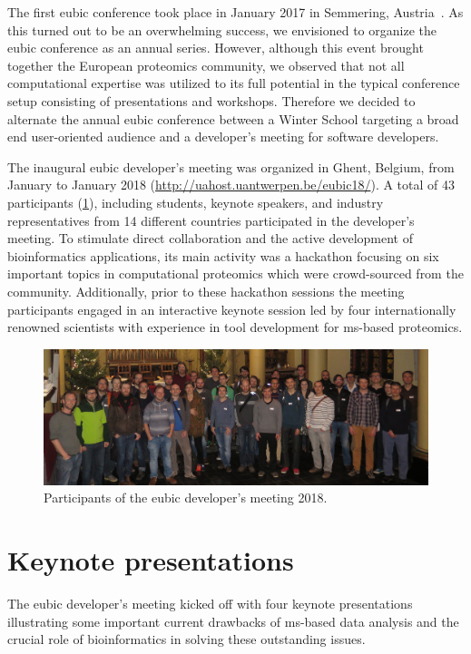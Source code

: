 \documentclass[fontsize=11pt, paper=a4, titlepage=false]{scrartcl}
\begin{document}
The first \gls{eubic} conference took place in January 2017 in Semmering, 
Austria~\autocite{Willems2017}. As this turned out to be an overwhelming 
success, we envisioned to organize the \gls{eubic} conference as an annual 
series. However, although this event brought together the European proteomics community, we observed that not all computational expertise was utilized to its full potential in the typical conference setup consisting of presentations and workshops. Therefore we 
decided to alternate the annual \gls{eubic} conference between a Winter School 
targeting a broad end user-oriented audience and a developer's meeting for 
software developers. 

The inaugural \gls{eubic} developer's meeting was organized in Ghent, Belgium, 
from January  to January  2018 
(\url{http://uahost.uantwerpen.be/eubic18/}). A total of 43 participants 
(\cref{fig:group_foto}), including students, keynote speakers, and industry 
representatives from 14 different countries participated in the developer's 
meeting. To stimulate direct collaboration and the active development of 
bioinformatics applications, its main activity was a hackathon focusing on six 
important topics in computational proteomics which were crowd-sourced from the 
community. Additionally, prior to these hackathon sessions the meeting 
participants engaged in an interactive keynote session led by four 
internationally renowned scientists with experience in tool development for 
\gls{ms}-based proteomics.

\begin{figure}[!h]
\includegraphics[width=\textwidth]{group_foto_eubic}
\caption{Participants of the \gls{eubic} developer's meeting 2018.}
\label{fig:group_foto}
\end{figure}

\section{Keynote presentations}

The \gls{eubic} developer's meeting kicked off with four keynote presentations 
illustrating some important current drawbacks of \gls{ms}-based data analysis 
and the crucial role of bioinformatics in solving these outstanding issues.
\end{document}

